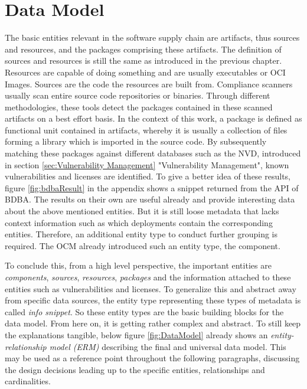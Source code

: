 \section{Data Model}
The basic entities relevant in the software supply chain are artifacts, thus sources and resources, and the packages comprising these artifacts. The definition of sources and resources is still the same as introduced in the previous chapter. Resources are capable of doing something and are usually executables or OCI Images. Sources are the code the resources are built from. Compliance scanners usually scan entire source code repositories or binaries. Through different methodologies, these tools detect the packages contained in these scanned artifacts on a best effort basis. In the context of this work, a package is defined as functional unit contained in artifacts, whereby it is usually a collection of files forming a library which is imported in the source code. By subsequently matching these packages against different databases such as the NVD, introduced in section \ref{sec:Vulnerability Management} "Vulnerability Management", known vulnerabilities and licenses are identified. To give a better idea of these results, figure \ref{fig:bdbaResult} in the appendix shows a snippet returned from the API of BDBA. The results on their own are useful already and provide interesting data about the above mentioned entities. But it is still loose metadata that lacks context information such as which deployments contain the corresponding entities. Therefore, an additional entity type to conduct further grouping is required. The OCM already introduced such an entity type, the component.\par
To conclude this, from a high level perspective, the important entities are \emph{components}, \emph{sources}, \emph{resources}, \emph{packages} and the information attached to these entities such as vulnerabilities and licenses. To generalize this and abstract away from specific data sources, the entity type representing these types of metadata is called \emph{info snippet}. So these entity types are the basic building blocks for the data model. From here on, it is getting rather complex and abstract. To still keep the explanations tangible, below figure \ref{fig:DataModel} already shows an \emph{entity-relationship model (ERM)} describing the final and universal data model. This may be used as a reference point throughout the following paragraphs, discussing the design decisions leading up to the specific entities, relationships and cardinalities.

